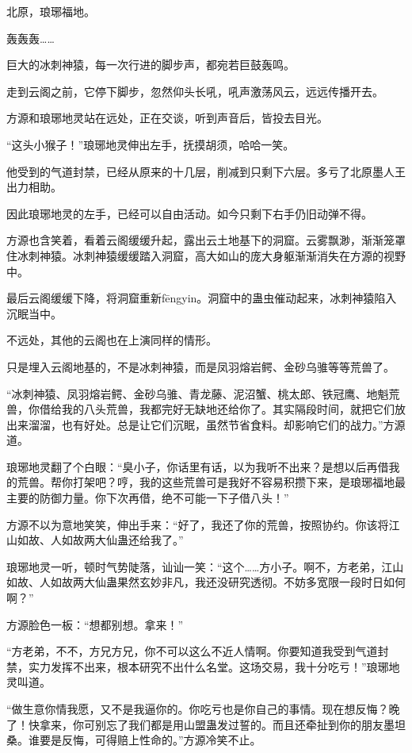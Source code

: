 
\begin{this_body}

北原，琅琊福地。

轰轰轰……

巨大的冰刺神猿，每一次行进的脚步声，都宛若巨鼓轰鸣。

走到云阁之前，它停下脚步，忽然仰头长吼，吼声激荡风云，远远传播开去。

方源和琅琊地灵站在远处，正在交谈，听到声音后，皆投去目光。

“这头小猴子！”琅琊地灵伸出左手，抚摸胡须，哈哈一笑。

他受到的气道封禁，已经从原来的十几层，削减到只剩下六层。多亏了北原墨人王出力相助。

因此琅琊地灵的左手，已经可以自由活动。如今只剩下右手仍旧动弹不得。

方源也含笑着，看着云阁缓缓升起，露出云土地基下的洞窟。云雾飘渺，渐渐笼罩住冰刺神猿。冰刺神猿缓缓踏入洞窟，高大如山的庞大身躯渐渐消失在方源的视野中。

最后云阁缓缓下降，将洞窟重新fēngyin。洞窟中的蛊虫催动起来，冰刺神猿陷入沉眠当中。

不远处，其他的云阁也在上演同样的情形。

只是埋入云阁地基的，不是冰刺神猿，而是凤羽熔岩鳄、金砂乌骓等等荒兽了。

“冰刺神猿、凤羽熔岩鳄、金砂乌骓、青龙藤、泥沼蟹、桃太郎、铁冠鹰、地魁荒兽，你借给我的八头荒兽，我都完好无缺地还给你了。其实隔段时间，就把它们放出来溜溜，也有好处。总是让它们沉眠，虽然节省食料。却影响它们的战力。”方源道。

琅琊地灵翻了个白眼：“臭小子，你话里有话，以为我听不出来？是想以后再借我的荒兽。帮你打架吧？哼，我的这些荒兽可是我好不容易积攒下来，是琅琊福地最主要的防御力量。你下次再借，绝不可能一下子借八头！”

方源不以为意地笑笑，伸出手来：“好了，我还了你的荒兽，按照协约。你该将江山如故、人如故两大仙蛊还给我了。”

琅琊地灵一听，顿时气势陡落，讪讪一笑：“这个……方小子。啊不，方老弟，江山如故、人如故两大仙蛊果然玄妙非凡，我还没研究透彻。不妨多宽限一段时日如何啊？”

方源脸色一板：“想都别想。拿来！”

“方老弟，不不，方兄方兄，你不可以这么不近人情啊。你要知道我受到气道封禁，实力发挥不出来，根本研究不出什么名堂。这场交易，我十分吃亏！”琅琊地灵叫道。

“做生意你情我愿，又不是我逼你的。你吃亏也是你自己的事情。现在想反悔？晚了！快拿来，你可别忘了我们都是用山盟蛊发过誓的。而且还牵扯到你的朋友墨坦桑。谁要是反悔，可得赔上性命的。”方源冷笑不止。


\end{this_body}
